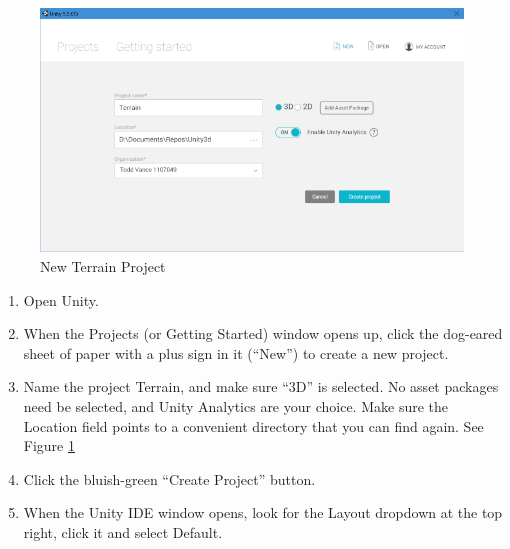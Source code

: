 \documentclass[letter,12pt]{article}
\begin{document}
\begin{figure}
  \includegraphics[width=6in]{RealLandscape/projects.png}
  \caption{New Terrain Project}
  \label{fig:projects}
\end{figure}

\begin{enumerate}
\item Open Unity.
\item When the Projects (or Getting Started) window opens up, click the dog-eared sheet of paper with a plus sign in it (“New”) to create a new project.
\item Name the project Terrain, and make sure “3D” is selected.  No asset packages need be selected, and Unity Analytics are your choice.  Make sure the Location field points to a convenient directory that you can find again.  See Figure \ref{fig:projects}
\item Click the bluish-green “Create Project” button.
\item When the Unity IDE window opens, look for the Layout dropdown at the top right, click it and select Default.
\end{enumerate}
\end{document}
